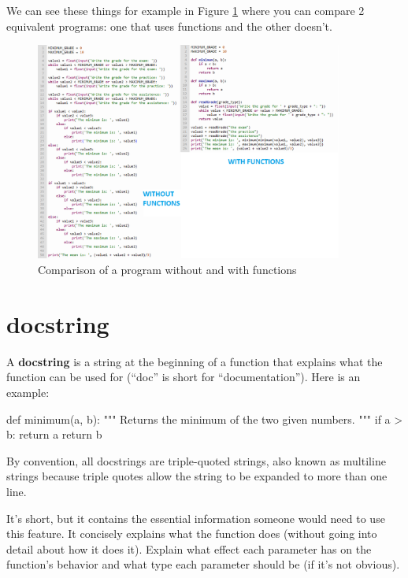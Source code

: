 We can see these things for example in Figure \ref{fig:sin.con.funciones} where you can compare 2 equivalent programs: one that uses functions and the other doesn't.

\begin{figure}[H]
    \centering
    \includegraphics[width=0.90\textwidth]{images/sin-con-funciones-eng.png}
    \caption{Comparison of a program without and with functions}
    \label{fig:sin.con.funciones}
\end{figure}


\section{docstring}
\label{docstring}

A {\bf docstring} is a string at the beginning of a function that explains what the function can be used for (``doc'' is short for ``documentation''). Here is an example:

\begin{python}
def minimum(a, b):
    """
    Returns the minimum of the two given numbers.
    """
    if a > b:
        return a
    return b
\end{python}
%
By convention, all docstrings are triple-quoted strings, also known as multiline strings because triple quotes allow the string to be expanded to more than one line.

It's short, but it contains the essential information someone would need to use this feature. It concisely explains what the function does (without going into detail about how it does it). Explain what effect each parameter has on the function's behavior and what type each parameter should be (if it's not obvious).

